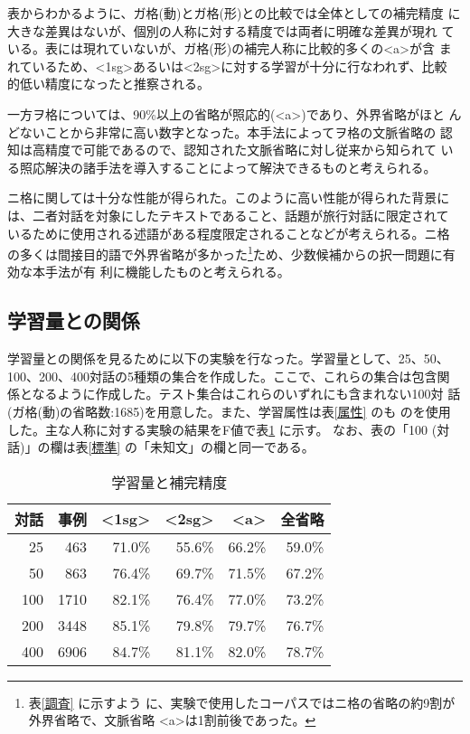 表からわかるように、ガ格(動)とガ格(形)との比較では全体としての補完精度
に大きな差異はないが、個別の人称に対する精度では両者に明確な差異が現れ
ている。表には現れていないが、ガ格(形)の補完人称に比較的多くの<a>が含
まれているため、<1sg>あるいは<2sg>に対する学習が十分に行なわれず、比較
的低い精度になったと推察される。

一方ヲ格については、90\%以上の省略が照応的(<a>)であり、外界省略がほと
んどないことから非常に高い数字となった。本手法によってヲ格の文脈省略の
認知は高精度で可能であるので、認知された文脈省略に対し従来から知られて
いる照応解決の諸手法を導入することによって解決できるものと考えられる。


ニ格に関しては十分な性能が得られた。このように高い性能が得られた背景に
は、二者対話を対象にしたテキストであること、話題が旅行対話に限定されて
いるために使用される述語がある程度限定されることなどが考えられる。ニ格
の多くは間接目的語で外界省略が多かった\footnote{表\ref{調査} に示すよう
に、実験で使用したコーパスではニ格の省略の約9割が外界省略で、文脈省略
<a>は1割前後であった。}ため、少数候補からの択一問題に有効な本手法が有
利に機能したものと考えられる。




\subsection{学習量との関係}
\label{節:学習量}

学習量との関係を見るために以下の実験を行なった。学習量として、25、50、
100、200、400対話の5種類の集合を作成した。ここで、これらの集合は包含関
係となるように作成した。テスト集合はこれらのいずれにも含まれない100対
話(ガ格(動)の省略数:1685)を用意した。また、学習属性は表\ref{属性} のも
のを使用した。主な人称に対する実験の結果をF値で表\ref{学習量} に示す。
なお、表の「100 (対話)」の欄は表\ref{標準} の「未知文」の欄と同一である。


\begin{table}
\caption{学習量と補完精度}
\label{学習量}
\begin{center}
\begin{tabular}{rr|*{4}{r}}
\hline\hline
対話 & 事例& <1sg>& <2sg>& <a>& 全省略 \\
\hline
 25 &  463 & 71.0\% & 55.6\% & 66.2\% & 59.0\% \\
 50 &  863 & 76.4\% & 69.7\% & 71.5\% & 67.2\% \\
100 & 1710 & 82.1\% & 76.4\% & 77.0\% & 73.2\% \\
200 & 3448 & 85.1\% & 79.8\% & 79.7\% & 76.7\% \\
400 & 6906 & 84.7\% & 81.1\% & 82.0\% & 78.7\% \\
\hline
\end{tabular}
\end{center}
\end{table}

